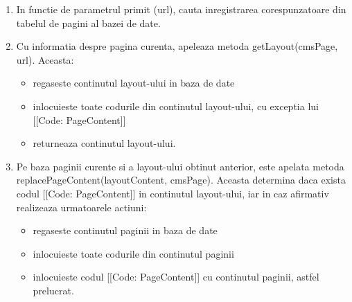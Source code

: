 \begin{enumerate}
\item{In functie de parametrul primit (url), cauta inregistrarea corespunzatoare din tabelul de pagini al bazei de date.}
\item{Cu informatia despre pagina curenta, apeleaza metoda getLayout(cmsPage, url). Aceasta:}
\begin{itemize}
\item{regaseste continutul layout-ului in baza de date}
\item{inlocuieste toate codurile din continutul layout-ului, cu exceptia lui [[Code: PageContent]]}
\item{returneaza continutul layout-ului.}
\end {itemize}
\item{Pe baza paginii curente si a layout-ului obtinut anterior, este apelata metoda replacePageContent(layoutContent, cmsPage). Aceasta determina daca exista codul [[Code: PageContent]] in continutul layout-ului, iar in caz afirmativ realizeaza urmatoarele actiuni:}
\begin{itemize}
\item {regaseste continutul paginii in baza de date}
\item{inlocuieste toate codurile din continutul paginii}
\item {inlocuieste codul [[Code: PageContent]] cu continutul paginii, astfel prelucrat.}
\end{itemize}
\end{enumerate}

\bigskip

